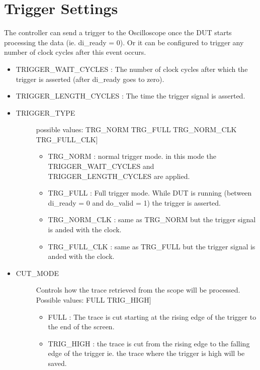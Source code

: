 \documentclass[letterpaper,10pt,english]{sphinxmanual}
\begin{document}
\section{Trigger Settings}
\label{\detokenize{controller_features:trigger-settings}}
The controller can send a trigger to the Oscilloscope once the DUT starts processing the data (ie. di\_ready = 0). Or it can be configured to trigger any number of clock cycles after this event occurs.
\begin{itemize}
\item {} 
TRIGGER\_WAIT\_CYCLES : The number of clock cycles after which the trigger is asserted (after di\_ready goes to zero).

\item {} 
TRIGGER\_LENGTH\_CYCLES : The time the trigger signal is asserted.

\item {} \begin{description}
\item[{TRIGGER\_TYPE}] \leavevmode{[}possible values: TRG\_NORM \textbar{} TRG\_FULL \textbar{} TRG\_NORM\_CLK \textbar{} TRG\_FULL\_CLK{]}\begin{itemize}
\item {} 
TRG\_NORM : normal trigger mode. in this mode the TRIGGER\_WAIT\_CYCLES and TRIGGER\_LENGTH\_CYCLES are applied.

\item {} 
TRG\_FULL : Full trigger mode. While DUT is running (between di\_ready = 0 and do\_valid = 1) the trigger is asserted.

\item {} 
TRG\_NORM\_CLK : same as TRG\_NORM but the trigger signal is anded with the clock.

\item {} 
TRG\_FULL\_CLK : same as TRG\_FULL but the trigger signal is anded with the clock.

\end{itemize}

\end{description}

\item {} \begin{description}
\item[{CUT\_MODE}] \leavevmode{[}Controls how the trace retrieved from the scope will be processed. Possible values: FULL \textbar{} TRIG\_HIGH{]}\begin{itemize}
\item {} 
FULL : The trace is cut starting at the rising edge of the trigger to the end of the screen.

\item {} 
TRIG\_HIGH : the trace is cut from the rising edge to the falling edge of the trigger ie. the trace where the trigger is high will be saved.

\end{itemize}

\end{description}

\end{itemize}
\end{document}

